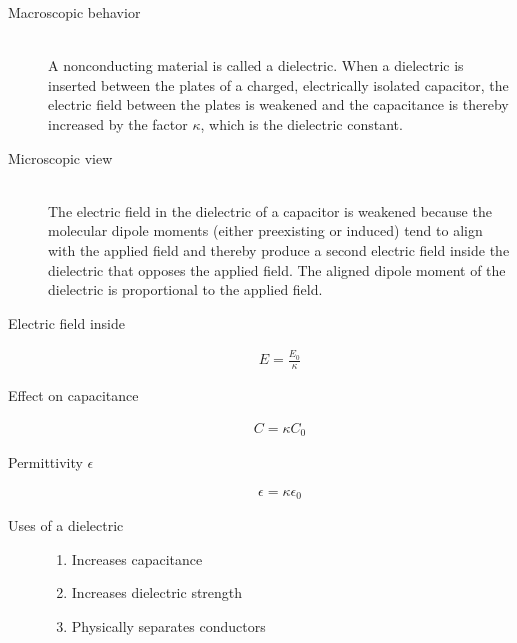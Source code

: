 \documentclass[../main.tex]{subfiles}
\begin{document}
\begin{description}
  \item[Macroscopic behavior] \hfill \\
    A nonconducting material is called a dielectric. When a dielectric is
    inserted between the plates of a charged, electrically isolated capacitor,
    the electric field between the plates is weakened and the capacitance is
    thereby increased by the factor $\kappa$, which is the dielectric
    constant.
  \item[Microscopic view] \hfill \\
    The electric field in the dielectric of a capacitor is weakened because the
    molecular dipole moments (either preexisting or induced) tend to align with
    the applied field and thereby produce a second electric field inside the
    dielectric that opposes the applied field. The aligned dipole moment of the
    dielectric is proportional to the applied field.
  \item[Electric field inside]
    \begin{align}
      E = \frac{E_0}{\kappa}
    \end{align}
  \item[Effect on capacitance]
    \begin{align}
       C = \kappa C_0
    \end{align}
  \item[Permittivity $\epsilon$]
    \begin{align}
       \epsilon = \kappa \epsilon_0
    \end{align}
  \item[Uses of a dielectric]
    \begin{enumerate}
      \item Increases capacitance
      \item Increases dielectric strength
      \item Physically separates conductors
    \end{enumerate}
\end{description}
\end{document}
